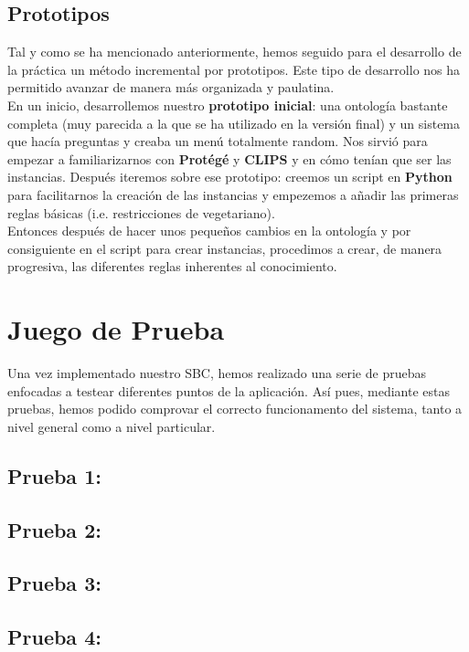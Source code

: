 \documentclass[12]{article}
\begin{document}
\subsection{Prototipos}
Tal y como se ha mencionado anteriormente, hemos seguido para el desarrollo de la práctica un método incremental por prototipos. Este tipo de desarrollo nos ha permitido avanzar de manera más organizada y paulatina. 
\\
En un inicio, desarrollemos nuestro \textbf{prototipo inicial}: una ontología bastante completa (muy parecida a la que se ha utilizado en la versión final) y un sistema que hacía preguntas y creaba un menú totalmente random.  Nos sirvió para empezar a familiarizarnos con \textbf{Protégé} y \textbf{CLIPS} y en cómo tenían que ser las instancias. Después iteremos sobre ese prototipo: creemos un script en \textbf{Python} para facilitarnos la creación de las instancias y empezemos a añadir las primeras reglas básicas (i.e. restricciones de vegetariano). 
\\
Entonces después de hacer unos pequeños cambios en la ontología y por consiguiente en el script para crear instancias, procedimos a crear, de manera progresiva, las diferentes reglas inherentes al conocimiento.  

\section{Juego de Prueba}
Una vez implementado nuestro SBC, hemos realizado una serie de pruebas enfocadas a testear diferentes puntos de la aplicación. Así pues, mediante estas pruebas, hemos podido comprovar el correcto funcionamento del sistema, tanto a nivel general como a nivel particular.

\subsection{Prueba 1: }
\subsection{Prueba 2: }
\subsection{Prueba 3: }
\subsection{Prueba 4: }
\end{document}
